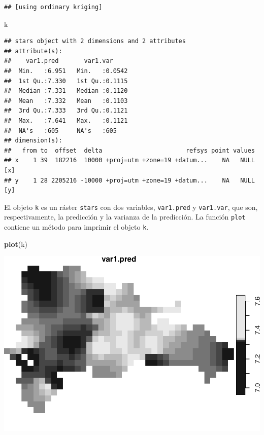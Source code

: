 \documentclass[11pt,]{article}
\newenvironment{Shaded}{\begin{snugshade}}{\end{snugshade}}
\newcommand{\KeywordTok}[1]{\textcolor[rgb]{0.13,0.29,0.53}{\textbf{#1}}}
\newcommand{\NormalTok}[1]{#1}
\begin{document}
\begin{verbatim}
## [using ordinary kriging]
\end{verbatim}

\begin{Shaded}
\begin{Highlighting}[]
\NormalTok{k}
\end{Highlighting}
\end{Shaded}

\begin{verbatim}
## stars object with 2 dimensions and 2 attributes
## attribute(s):
##    var1.pred       var1.var      
##  Min.   :6.951   Min.   :0.0542  
##  1st Qu.:7.330   1st Qu.:0.1115  
##  Median :7.331   Median :0.1120  
##  Mean   :7.332   Mean   :0.1103  
##  3rd Qu.:7.333   3rd Qu.:0.1121  
##  Max.   :7.641   Max.   :0.1121  
##  NA's   :605     NA's   :605     
## dimension(s):
##   from to  offset  delta                       refsys point values    
## x    1 39  182216  10000 +proj=utm +zone=19 +datum...    NA   NULL [x]
## y    1 28 2205216 -10000 +proj=utm +zone=19 +datum...    NA   NULL [y]
\end{verbatim}

El objeto \texttt{k} es un ráster \texttt{stars} con dos variables,
\texttt{var1.pred} y \texttt{var1.var}, que son, respectivamente, la
predicción y la varianza de la predicción. La función \texttt{plot}
contiene un método para imprimir el objeto \texttt{k}.

\begin{Shaded}
\begin{Highlighting}[]
\KeywordTok{plot}\NormalTok{(k)}
\end{Highlighting}
\end{Shaded}

\includegraphics[width=800px]{proyecto_files/figure-latex/krige-plot-raw-1}
\end{document}
